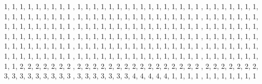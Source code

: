 \begin{DoxyCode}
 
{
        
                1,      1,      1,      1,      1,      1,      1,      1,      1
      ,       1,      1,      1,      1,      1,      1,      1,      
                1,      1,      1,      1,      1,      1,      1,      1,      1
      ,       1,      1,      1,      1,      1,      1,      1,      
                1,      1,      1,      1,      1,      1,      1,      1,      1
      ,       1,      1,      1,      1,      1,      1,      1,      
                1,      1,      1,      1,      1,      1,      1,      1,      1
      ,       1,      1,      1,      1,      1,      1,      1,      
                1,      1,      1,      1,      1,      1,      1,      1,      1
      ,       1,      1,      1,      1,      1,      1,      1,      
                1,      1,      1,      1,      1,      1,      1,      1,      1
      ,       1,      1,      1,      1,      1,      1,      1,      
                1,      1,      1,      1,      1,      1,      1,      1,      1
      ,       1,      1,      1,      1,      1,      1,      1,      
                1,      1,      1,      1,      1,      1,      1,      1,      1
      ,       1,      1,      1,      1,      1,      1,      1,      
                1,      1,      1,      1,      1,      1,      1,      1,      1
      ,       1,      1,      1,      1,      1,      1,      1,      
                1,      1,      1,      1,      1,      1,      1,      1,      1
      ,       1,      1,      1,      1,      1,      1,      1,      
                1,      1,      1,      1,      1,      1,      1,      1,      1
      ,       1,      1,      1,      1,      1,      1,      1,      
                1,      1,      1,      1,      1,      1,      1,      1,      1
      ,       1,      1,      1,      1,      1,      1,      1,      
                1,      1,      2,      2,      2,      2,      2,      2,      2
      ,       2,      2,      2,      2,      2,      2,      2,      
                2,      2,      2,      2,      2,      2,      2,      2,      2
      ,       2,      2,      2,      2,      2,      2,      2,      
                3,      3,      3,      3,      3,      3,      3,      3,      3
      ,       3,      3,      3,      3,      3,      3,      3,      
                4,      4,      4,      4,      4,      1,      1,      1,      1
      ,       1,      1,      1,      1,      1,      1,      1       
}
\end{DoxyCode}



